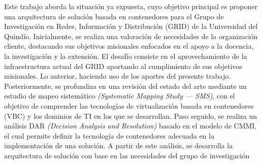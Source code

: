 Este trabajo aborda la situación ya expuesta, cuyo objetivo principal es proponer una arquitectura de solución basada en contenedores para el Grupo de Investigación en Redes, Información y Distribución (GRID) de la Universidad del Quindío. Inicialmente, se realiza una valoración de necesidades de la organización cliente, destacando sus objetivos misionales enfocados en el apoyo a la docencia, la investigación y la extensión. El desafío consiste en el aprovechamiento de la infraestructura actual del GRID aportando al cumplimiento de sus objetivos misionales. Lo anterior, haciendo uso de los aportes del presente trabajo. Posteriormente, se profundiza en una revisión del estado del arte mediante un estudio de mapeo sistemático \textit{(Systematic Mapping Study --- SMS)}, con el objetivo de comprender las tecnologías de virtualización basada en contenedores (VBC) y los dominios de TI en los que se desarrollan. Paso seguido, se realiza un análisis DAR \textit{(Decision Analysis and Resolution)} basado en el modelo de CMMI, el cual permite definir la tecnología de contenedores adecuada en la implementación de una solución. A partir de este análisis, se desarrolla la arquitectura de solución con base en las necesidades del grupo de investigación 
